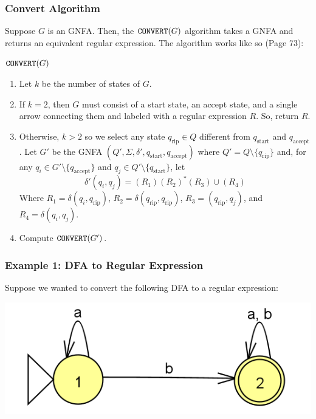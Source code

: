 \documentclass[letterpaper]{article}
\begin{document}
\subsubsection{Convert Algorithm}
Suppose $G$ is an GNFA. Then, the $\texttt{CONVERT}(G)$ algorithm takes a GNFA and returns an equivalent regular expression. The algorithm works like so (Page 73): 
\begin{mdframed}[]
    $\texttt{CONVERT}(G)$
    \begin{enumerate}
        \item Let $k$ be the number of states of $G$. 
        \item If $k = 2$, then $G$ must consist of a start state, an accept state, and a single arrow connecting them and labeled with a regular expression $R$. So, return $R$. 
        \item Otherwise, $k > 2$ so we select any state $q_{\text{rip}} \in Q$ different from $q_{\text{start}}$ and $q_{\text{accept}}$. Let $G'$ be the GNFA $(Q', \Sigma, \delta', q_{\text{start}}, q_{\text{accept}})$ where $Q' = Q \setminus \{q_{\text{rip}}\}$ and, for any $q_i \in G' \setminus \{q_{\text{accept}}\}$ and $q_j \in Q' \setminus \{q_{\text{start}}\}$, let
        \[\delta'(q_i, q_j) = (R_1)(R_2)^* (R_3) \cup (R_4)\]
        Where $R_1 = \delta(q_i, q_{\text{rip}})$, $R_2 = \delta(q_{\text{rip}}, q_{\text{rip}})$, $R_3 = (q_{\text{rip}}, q_j)$, and $R_4 = \delta(q_i, q_j)$. 
        \item Compute $\texttt{CONVERT}(G')$. 
    \end{enumerate}
\end{mdframed}

\subsubsection{Example 1: DFA to Regular Expression}
Suppose we wanted to convert the following DFA to a regular expression:
\begin{center}
    \includegraphics[scale=0.5]{../assets/dfa_regex_1.png}
\end{center}
\end{document}

